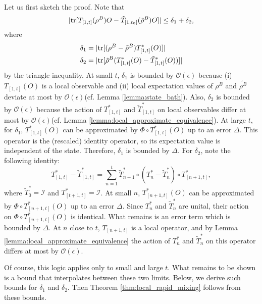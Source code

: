 \documentclass[prx,aps,amsmath,amssymb,floatfix,superscriptaddress,11pt,tightenlines,longbibliography,onecolumn,notitlepage]{revtex4-1}
\newcommand{\Tr}{\textnormal{tr}}
\begin{document}
  Let us first sketch the proof. Note that
  \begin{equation}
    |\Tr[T_{[1,t]}(\rho^B) O - \tilde{T}_{[1,t_0]}(\tilde{\rho}^B)O] | \leq \delta_1 + \delta_2,
  \end{equation}
  where
  \begin{equation}
    \begin{aligned}
      \delta_1 &= |\Tr[(\rho^B - \tilde{\rho}^B) T_{[1,t]}^*(O)]|\\
      \delta_2 &= |\Tr[\tilde{\rho}^B(T^{*}_{[1,t]}(O) - \tilde{T}_{[1,t]}^*(O))]|
    \end{aligned} 
  \end{equation}
  by the triangle inequality. At small $t$, $\delta_1$ is bounded by $\mathcal{O}(\epsilon)$ because (i) $T_{[1,t]}(O)$ is a local observable and (ii) local expectation values of $\rho^B$ and $\tilde{\rho^B}$ deviate at most by $\mathcal{O}(\epsilon)$(cf. Lemma \ref{lemma:state_bath}). Also, $\delta_2$ is bounded by $\mathcal{O}(\epsilon)$ because the action of $T^{*}_{[1,t]}$ and $\tilde{T}_{[1,t]}^*$ on local observables differ at most by $\mathcal{O}(\epsilon)$(cf. Lemma \ref{lemma:local_approximate_equivalence}). At large $t$, for $\delta_1$, $T_{[1,t]}^*(O)$ can be approximated by $\Phi \circ T_{[1,t]}^*(O)$ up to an error $\Delta$. This operator is the (rescaled) identity operator, so its expectation value is independent of the state. Therefore, $\delta_1$ is bounded by $\Delta$. For $\delta_2$, note the following identity:
  \begin{equation}
    T_{[1,t]}^* - \tilde{T}_{[1,t]}^* = \sum_{n=1}^t\tilde{T}_{n-1}^* \circ (T_n^* - \tilde{T}_n^*)\circ T_{[n+1,t]}^*,
  \end{equation}
  where $\tilde{T}^*_0 = \mathcal{I}$ and $T_{[t+1,t]}^*=\mathcal{I}$. At small $n$, $T_{[n+1,t]}^*(O)$ can be approximated by $\Phi\circ T_{[n+1,t]}^*(O)$ up to an error $\Delta$. Since $T_n^*$ and $\tilde{T}_n^*$ are unital, their action on $\Phi\circ T_{[n+1,t]}^*(O)$ is identical. What remains is an error term which is bounded by $\Delta$. At $n$ close to $t$, $T_{[n+1,t]}$ is a local operator, and by Lemma \ref{lemma:local_approximate_equivalence} the action of $T_n^*$ and $\tilde{T}_n^*$ on this operator differs at most by $\mathcal{O}(\epsilon)$.

  Of course, this logic applies only to small and large $t$. What remains to be shown is a bound that interpolates between these two limits. Below, we derive such bounds for $\delta_1$ and $\delta_2$. Then Theorem \ref{thm:local_rapid_mixing} follows from these bounds.
\end{document}
